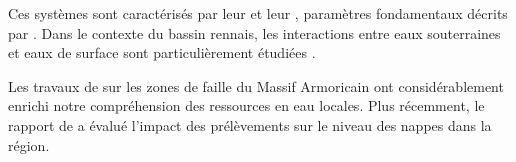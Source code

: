 \documentclass[12pt,a4paper]{report}
\begin{document}
Ces systèmes sont caractérisés par leur \permeability{} et leur \porosity{}, paramètres fondamentaux décrits par \textcite{Bear2018}. Dans le contexte du bassin rennais, les interactions entre eaux souterraines et eaux de surface sont particulièrement étudiées \parencite{Aquilina2012}.

Les travaux de \textcite{Roques2013} sur les zones de faille du Massif Armoricain ont considérablement enrichi notre compréhension des ressources en eau locales. Plus récemment, le rapport de \parencite{BRGM2020} a évalué l'impact des prélèvements sur le niveau des nappes dans la région.

% 
% 
% 

\cleardoublepage
{}
\printbibliography[heading=bibliography, title=Références bibliographiques]

% 

% 
% 
\end{document}
